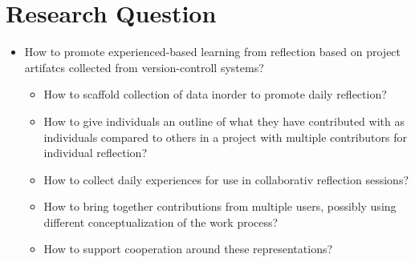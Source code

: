 \section{Research Question}

\begin{itemize}
	\item How to promote experienced-based learning from reflection based on project artifatcs collected from version-controll systems?
	\begin{itemize}
		\item How to scaffold collection of data inorder to promote daily reflection?
		\item How to give individuals an outline of what they have contributed with as individuals compared to others in a project with multiple contributors for individual reflection?
		\item How to collect daily experiences for use in collaborativ reflection sessions?
		\item How to bring together contributions from multiple users, possibly using different conceptualization of the work process? 
		\item How to support cooperation around these representations?
	\end{itemize}
\end{itemize}